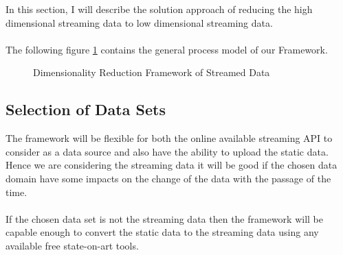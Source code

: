 In this section, I will describe the solution approach of reducing the high dimensional streaming data to low dimensional streaming data.\\\\
The following figure \ref{fig:labelOfThesisFlowChart} contains the general process model of our Framework.
\begin{figure}[htbp]
	\centering
	
	
	\caption{Dimensionality Reduction Framework of Streamed Data}
	\label{fig:labelOfThesisFlowChart}
\end{figure}
\subsection{Selection of Data Sets}
The framework will be flexible for both the online available streaming API to consider as a data source and also have the ability to upload the static data. Hence we are considering the streaming data it will be good if the chosen data domain have some impacts on the change of the data with the passage of the time.\\\\
If the chosen data set is not the streaming data then the framework will be capable enough to convert the static data to the streaming data using any available free state-on-art tools.
